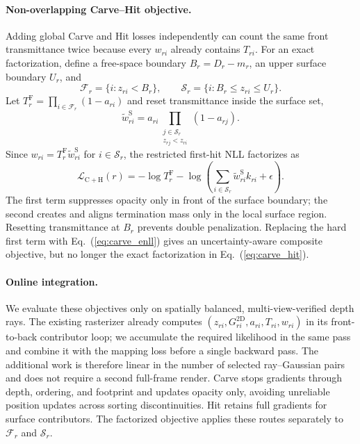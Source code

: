 \paragraph{Non-overlapping Carve--Hit objective.}
Adding global Carve and Hit losses independently can count the same front
transmittance twice because every $w_{ri}$ already contains $T_{ri}$. For an
exact factorization, define a free-space boundary $B_r=D_r-m_r$, an upper
surface boundary $U_r$, and
\begin{equation}\label{eq:carve_hit_partition}
  \mathcal F_r=\{i:z_{ri}<B_r\},\qquad
  \mathcal S_r=\{i:B_r\leq z_{ri}\leq U_r\}.
\end{equation}
Let
$T_r^{\mathrm F}=\prod_{i\in\mathcal F_r}(1-a_{ri})$ and reset
transmittance inside the surface set,
\begin{equation}\label{eq:local_hit_weight}
  \widetilde w_{ri}^{\mathrm S}
  =a_{ri}\!\!\prod_{\substack{j\in\mathcal S_r\\z_{rj}<z_{ri}}}
  (1-a_{rj}).
\end{equation}
Since $w_{ri}=T_r^{\mathrm F}\widetilde w_{ri}^{\mathrm S}$ for
$i\in\mathcal S_r$, the restricted first-hit NLL factorizes as
\begin{equation}\label{eq:carve_hit}
  \mathcal L_{\mathrm{C+H}}(r)
  =-\log T_r^{\mathrm F}
  -\log\!\left(
  \sum_{i\in\mathcal S_r}\widetilde w_{ri}^{\mathrm S}k_{ri}
  +\epsilon\right).
\end{equation}
The first term suppresses opacity only in front of the surface boundary; the
second creates and aligns termination mass only in the local surface region.
Resetting transmittance at $B_r$ prevents double penalization. Replacing the
hard first term with Eq.~(\ref{eq:carve_enll}) gives an uncertainty-aware
composite objective, but no longer the exact factorization in
Eq.~(\ref{eq:carve_hit}).

\paragraph{Online integration.}
We evaluate these objectives only on spatially balanced, multi-view-verified
depth rays. The existing rasterizer already computes
$(z_{ri},G_{ri}^{\mathrm{2D}},a_{ri},T_{ri},w_{ri})$ in its front-to-back
contributor loop; we accumulate the required likelihood in the same pass and
combine it with the mapping loss before a single backward pass. The additional
work is therefore linear in the number of selected ray--Gaussian pairs and
does not require a second full-frame render. Carve stops gradients through
depth, ordering, and footprint and updates opacity only, avoiding unreliable
position updates across sorting discontinuities. Hit retains full gradients
for surface contributors. The factorized objective applies these routes
separately to $\mathcal F_r$ and $\mathcal S_r$.

